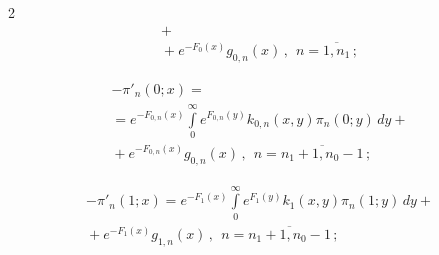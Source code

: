 \begin{multicols}{2}
\begin{multline}
+{}\\


{}+


e^{-F_0(x)} g_{0,n}(x) \,,


\ \ n=\overline{1,n_1}\,;


\end{multline}







\vspace*{-12pt}





\noindent


\begin{multline}


\label{pi-2-m}


-\pi'_n(0;x) = {}\\


{}=e^{-F_{0,n}(x)} \int\limits_0^\infty e^{F_{0,n}(y)} 


k_{0,n}(x,y) \pi_n(0;y)\, dy +{}\\


{}+


e^{-F_{0,n}(x)} g_{0,n}(x) \,, \ \ n=\overline{n_1+1,n_0-1}\,;


\end{multline}







\vspace*{-12pt}





\noindent


\begin{multline}


\label{pi-3-m}


-\pi'_n(1;x) = e^{-F_{1}(x)} \int\limits_0^\infty e^{F_{1}(y)} k_{1}(x,y) \pi_n(1;y)\, dy


+{}\\


{}+


e^{-F_{1}(x)} g_{1,n}(x) \,, \ \ n=\overline{n_1+1,n_0-1}\,;


\end{multline}








\end{multicols}
